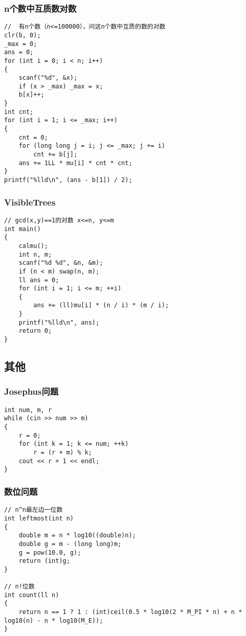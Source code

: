 \documentclass[a4]{article}
\begin{document}
\subsubsection{n个数中互质数对数}
\begin{lstlisting}
//  有n个数（n<=100000），问这n个数中互质的数的对数
clr(b, 0);
_max = 0;
ans = 0;
for (int i = 0; i < n; i++)
{
    scanf("%d", &x);
    if (x > _max) _max = x;
    b[x]++;
}
int cnt;
for (int i = 1; i <= _max; i++)
{
    cnt = 0;
    for (long long j = i; j <= _max; j += i)
        cnt += b[j];
    ans += 1LL * mu[i] * cnt * cnt;
}
printf("%lld\n", (ans - b[1]) / 2);
\end{lstlisting}
\subsubsection{VisibleTrees}
\begin{lstlisting}
// gcd(x,y)==1的对数 x<=n, y<=m
int main()
{
    calmu();
    int n, m;
    scanf("%d %d", &n, &m);
    if (n < m) swap(n, m);
    ll ans = 0;
    for (int i = 1; i <= m; ++i)
    {
        ans += (ll)mu[i] * (n / i) * (m / i);
    }
    printf("%lld\n", ans);
    return 0;
}
\end{lstlisting}
\subsection{其他}
\subsubsection{Josephus问题}
\begin{lstlisting}
int num, m, r
while (cin >> num >> m)
{
    r = 0;
    for (int k = 1; k <= num; ++k)
        r = (r + m) % k;
    cout << r + 1 << endl;
}
\end{lstlisting}
\subsubsection{数位问题}
\begin{lstlisting}
// n^n最左边一位数
int leftmost(int n)
{
    double m = n * log10((double)n);
    double g = m - (long long)m;
    g = pow(10.0, g);
    return (int)g;
}

// n!位数
int count(ll n)
{
    return n == 1 ? 1 : (int)ceil(0.5 * log10(2 * M_PI * n) + n * log10(n) - n * log10(M_E));
}
\end{lstlisting}
\end{document}
